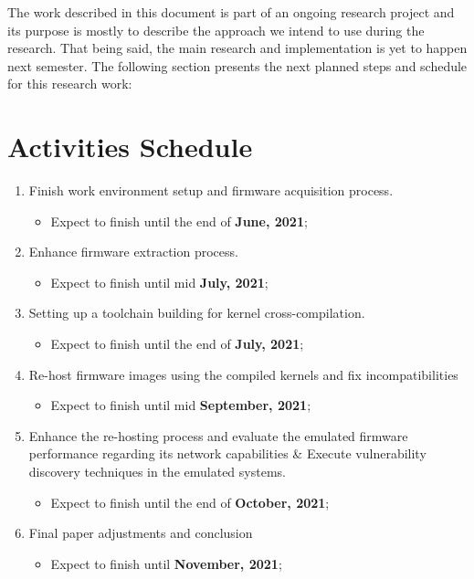 The work described in this document is part of an ongoing research project and its purpose is mostly to describe the approach we intend to use during the research. That being said, the main research and implementation is yet to happen next semester. The following section presents the next planned steps and schedule for this research work:

\section{Activities Schedule}

\begin{enumerate}
    \item Finish work environment setup and firmware acquisition process.
    \begin{itemize}
        \item Expect to finish until the end of \textbf{June, 2021};
    \end{itemize}

    \item Enhance firmware extraction process.
    \begin{itemize}
        \item Expect to finish until mid \textbf{July, 2021};
    \end{itemize}
    
    \item Setting up a toolchain building for kernel cross-compilation.
    \begin{itemize}
        \item Expect to finish until the end of \textbf{July, 2021};
    \end{itemize}
    
    \item Re-host firmware images using the compiled kernels and fix incompatibilities
    \begin{itemize}
        \item Expect to finish until mid \textbf{September, 2021};
    \end{itemize}
    
    \item Enhance the re-hosting process and evaluate the emulated firmware performance regarding its network capabilities \& Execute vulnerability discovery techniques in the emulated systems.
    \begin{itemize}
        \item Expect to finish until the end of \textbf{October, 2021};
    \end{itemize}
    
    \item Final paper adjustments and conclusion
    \begin{itemize}
        \item Expect to finish until \textbf{November, 2021};
    \end{itemize}
\end{enumerate}